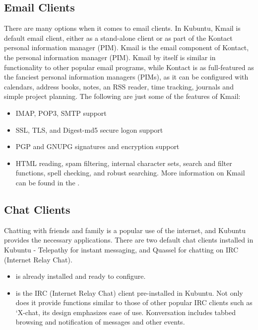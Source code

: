 \documentclass[letterpaper,10pt,english]{sphinxmanual}
\begin{document}
\subsection{Email Clients}
\label{\detokenize{docs/software:email-clients}}
There are many options when it comes to email clients. In Kubuntu, Kmail is default email client, either as a stand-alone client or as part of the Kontact personal information manager (PIM). Kmail is the email component of Kontact, the  personal information manager (PIM). Kmail by itself is similar in functionality to other popular email programs, while Kontact is as full-featured as the fanciest personal information managers (PIMs), as it can be configured with calendars, address books, notes, an RSS reader, time tracking, journals and simple project planning. The following are just some of the features of Kmail:
\begin{itemize}
\item {} 
IMAP, POP3, SMTP support

\item {} 
SSL, TLS, and Digest-md5 secure logon support

\item {} 
PGP and GNUPG signatures and encryption support

\item {} 
HTML reading, spam filtering, internal character sets, search and filter functions, spell checking, and robust searching. More information on Kmail can be found in the .

\end{itemize}


\subsection{Chat Clients}
\label{\detokenize{docs/software:chat-clients}}
Chatting with friends and family is a popular use of the internet, and Kubuntu provides the necessary applications. There are two default chat clients installed in Kubuntu -  Telepathy for instant messaging, and Quassel for chatting on IRC (Internet Relay Chat).
\begin{itemize}
\item {} 
  is already installed and ready to configure.

\item {} 
 is the IRC (Internet Relay Chat) client pre-installed in Kubuntu. Not only does it provide functions similar to those of other popular IRC clients such as `X-chat, its design emphasizes ease of use. Konversation includes tabbed browsing and notification of messages and other events.

\end{itemize}
\end{document}

